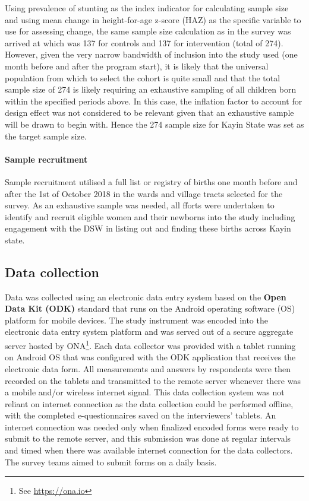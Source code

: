 \documentclass[12pt,a4paper]{article}
\let\oldparagraph\paragraph
\renewcommand{\paragraph}[1]{\oldparagraph{#1}\mbox{}}
\let\rmarkdownfootnote\footnote%
\def\footnote{\protect\rmarkdownfootnote}
\begin{document}
Using prevalence of stunting as the index indicator for calculating sample size and using mean change in height-for-age z-score (HAZ) as the specific variable to use for assessing change, the same sample size calculation as in the survey was arrived at which was 137 for controls and 137 for intervention (total of 274).
However, given the very narrow bandwidth of inclusion into the study used (one month before and after the program start), it is likely that the universal population from which to select the cohort is quite small and that the total sample size of 274 is likely requiring an exhaustive sampling of all children born within the specified periods above. In this case, the inflation factor to account for design effect was not considered to be relevant given that an exhaustive sample will be drawn to begin with. Hence the 274 sample size for Kayin State was set as the target sample size.

\hypertarget{sample-recruitment}{%
\paragraph{Sample recruitment}\label{sample-recruitment}}

Sample recruitment utilised a full list or registry of births one month before and after the 1st of October 2018 in the wards and village tracts selected for the survey. As an exhaustive sample was needed, all fforts were undertaken to identify and recruit eligible women and their newborns into the study including engagement with the DSW in listing out and finding these births across Kayin state.

\hypertarget{data-collection}{%
\subsection{Data collection}\label{data-collection}}

Data was collected using an electronic data entry system based on the \textbf{Open Data Kit (ODK)} standard that runs on the Android operating software (OS) platform for mobile devices. The study instrument was encoded into the electronic data entry system platform and was served out of a secure aggregate server hosted by ONA\footnote{See \url{https://ona.io}}. Each data collector was provided with a tablet running on Android OS that was configured with the ODK application that receives the electronic data form. All measurements and answers by respondents were then recorded on the tablets and transmitted to the remote server whenever there was a mobile and/or wireless internet signal. This data collection system was not reliant on internet connection as the data collection could be performed offline, with the completed e-questionnaires saved on the interviewers' tablets. An internet connection was needed only when finalized encoded forms were ready to submit to the remote server, and this submission was done at regular intervals and timed when there was available internet connection for the data collectors. The survey teams aimed to submit forms on a daily basis.
\end{document}
